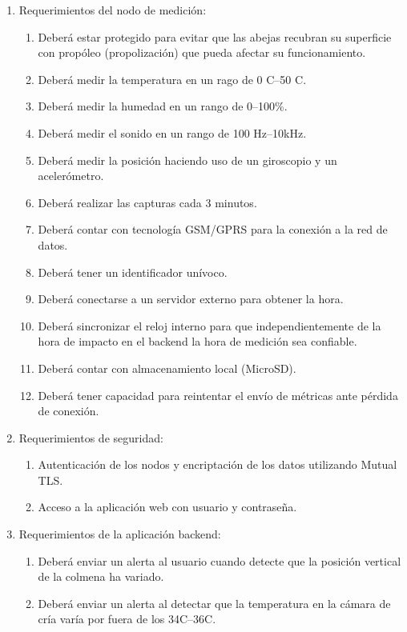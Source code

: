 \documentclass[
11pt, %
codirector, %
]{charter}
\begin{document}
\begin{enumerate}
	\item Requerimientos del nodo de medición:
		\begin{enumerate}
			\item Deberá estar protegido para evitar que las abejas recubran su superficie con propóleo (propolización) que pueda afectar su funcionamiento.
			\item Deberá medir la temperatura en un rago de 0 \textdegree{}C--50 \textdegree{}C.
			\item Deberá medir la humedad en un rango de 0--100\%.
			\item Deberá medir el sonido en un rango de 100 Hz--10kHz.
			\item Deberá medir la posición haciendo uso de un giroscopio y un acelerómetro.
			\item Deberá realizar las capturas cada 3 minutos.
			\item Deberá contar con tecnología GSM/GPRS para la conexión a la red de datos.
			\item Deberá tener un identificador unívoco.
			\item Deberá conectarse a un servidor externo para obtener la hora.
			\item Deberá sincronizar el reloj interno para que independientemente de la hora de impacto en el backend la hora de medición sea confiable.
			\item Deberá contar con almacenamiento local (MicroSD).
			\item Deberá tener capacidad para reintentar el envío de métricas ante pérdida de conexión.
		\end{enumerate}
	\item Requerimientos de seguridad:
		\begin{enumerate}
			\item Autenticación de los nodos y encriptación de los datos utilizando Mutual TLS.
			\item Acceso a la aplicación web con usuario y contraseña.
		\end{enumerate}
	\item Requerimientos de la aplicación backend:
		\begin{enumerate}
			\item Deberá enviar un alerta al usuario cuando detecte que la posición vertical de la colmena ha variado.
			\item Deberá enviar un alerta al detectar que la temperatura en la cámara de cría varía por fuera de los 34\textdegree{}C--36\textdegree{}C.

\end{enumerate}
\end{enumerate}
\end{document}
